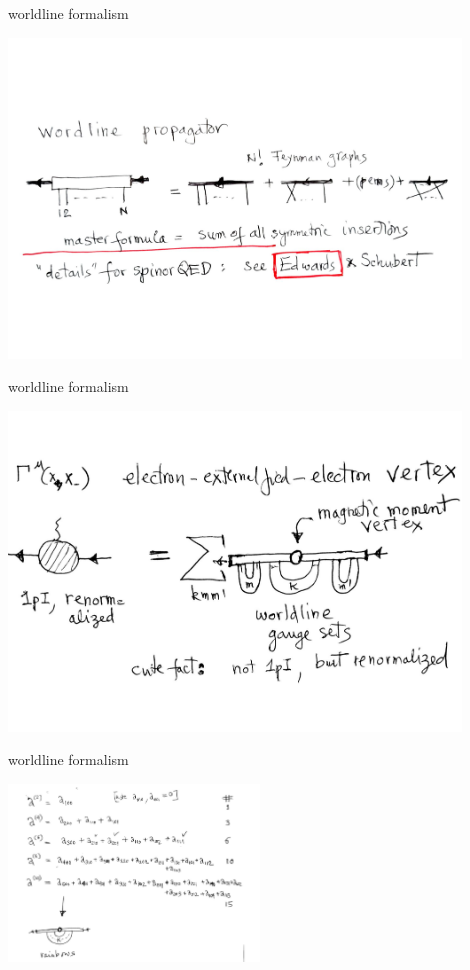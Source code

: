 \begin{frame}{worldline formalism}
\begin{center}
\includegraphics[width=0.90\textwidth]{worldlinProp}
\end{center}
\end{frame}
\begin{frame}{worldline formalism}
\begin{center}
\includegraphics[width=0.90\textwidth]{worldlineGsets}
\end{center}
\end{frame}
\begin{frame}{worldline formalism}
\begin{center}
\includegraphics[width=0.50\textwidth]{gaugeSets}
\end{center}
\end{frame}
